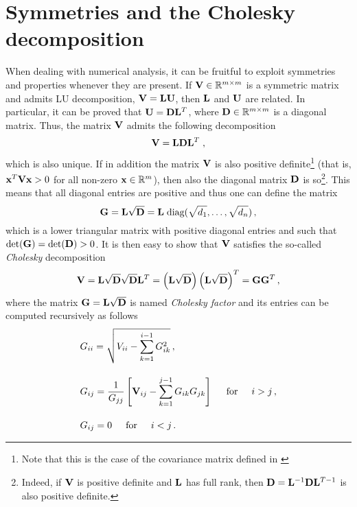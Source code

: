 \section{Symmetries and the Cholesky decomposition}
When dealing with numerical analysis, it can be fruitful to exploit symmetries and properties whenever they are present. If $\mathbf{V} \in \mathbb{R}^{m\times m}$ is a symmetric matrix and admits LU decomposition, $\mathbf{V} = \mathbf{L} \mathbf{U}$, then $\mathbf{L}$ and $\mathbf{U}$ are related. In particular, it can be proved that $\mathbf{U} = \mathbf{D} \mathbf{L}^T$, where $\mathbf{D} \in \mathbb{R}^{m \times m}$ is a diagonal matrix. Thus, the matrix $\mathbf{V}$ admits the following decomposition
\begin{equation}
    \mathbf{V} = \mathbf{L} \mathbf{D} \mathbf{L}^T \;,
\end{equation}
which is also unique. If in addition the matrix $\mathbf{V}$ is also positive definite\footnote{\footnotesize{Note that this is the case of the covariance matrix defined in }} (that is, $\mathbf{x}^T \mathbf{V} \mathbf{x} > 0$ for all non-zero $\mathbf{x} \in \mathbb{R}^{m}$), then also the diagonal matrix $\mathbf{D}$ is so\footnote{\footnotesize Indeed, if $\mathbf{V}$ is positive definite and $\mathbf{L}$ has full rank, then $\mathbf{D} = \mathbf{L}^{-1} \mathbf{D} \mathbf{L}^{T -1}$ is also positive definite.}. This means that all diagonal entries are positive and thus one can define the matrix
\begin{equation}
    \mathbf{G} = \mathbf{L} \sqrt{\mathbf{D}} = \mathbf{L} \; \textrm{diag}(\sqrt{d_1},\dots, \sqrt{d_{n}})\,,
\end{equation}
which is a lower triangular matrix with positive diagonal entries and such that $\det (\mathbf{G}) = \det (\mathbf{D}) > 0$. It is then easy to show that $\mathbf{V}$ satisfies the so-called \textit{Cholesky} decomposition
\begin{equation}
    \mathbf{V} = \mathbf{L} \sqrt{\mathbf{D}} \sqrt{\mathbf{D}} \mathbf{L}^T = \left( \mathbf{L} \sqrt{\mathbf{D}} \right) \left( \mathbf{L} \sqrt{\mathbf{D}} \right)^{T} = \mathbf{G} \mathbf{G}^{T} \,,
\end{equation}
where the matrix $\mathbf{G} = \mathbf{L} \sqrt{\mathbf{D}}$ is named \textit{Cholesky factor} and its entries can be computed recursively as follows
\begin{align}
    &G_{ii} = \sqrt{V_{ii} - \sum_{k=1}^{i-1} G_{ik}^2}\,,\\[10pt]
    & G_{ij} = \frac{1}{G_{jj}} \left[ \mathbf{V}_{ij} - \sum_{k=1}^{j-1} G_{ik} G_{jk}\right] \hspace{5mm} \textrm{for} \hspace{5mm} i>j \,,\\[10pt]
    &G_{ij} = 0 \hspace{5mm} \textrm{for} \hspace{5mm} i<j \, .
\end{align}
